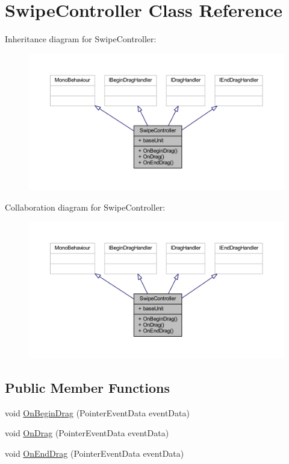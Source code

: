 \hypertarget{class_swipe_controller}{}\section{Swipe\+Controller Class Reference}
\label{class_swipe_controller}


Inheritance diagram for Swipe\+Controller\+:\nopagebreak
\begin{figure}[H]
\begin{center}
\leavevmode
\includegraphics[width=350pt]{class_swipe_controller__inherit__graph}
\end{center}
\end{figure}


Collaboration diagram for Swipe\+Controller\+:\nopagebreak
\begin{figure}[H]
\begin{center}
\leavevmode
\includegraphics[width=350pt]{class_swipe_controller__coll__graph}
\end{center}
\end{figure}
\subsection*{Public Member Functions}
\begin{DoxyCompactItemize}
\item 
void \mbox{\hyperlink{class_swipe_controller_a6f7b3f648901c5cc45a9da620ec7ccfa}{On\+Begin\+Drag}} (Pointer\+Event\+Data event\+Data)
\item 
void \mbox{\hyperlink{class_swipe_controller_a5d6462d855ab4cd7496dde16c7eba5f3}{On\+Drag}} (Pointer\+Event\+Data event\+Data)
\item 
void \mbox{\hyperlink{class_swipe_controller_a59530aa6a8d5a2de12d7f39851ce3d2b}{On\+End\+Drag}} (Pointer\+Event\+Data event\+Data)
\end{DoxyCompactItemize}

